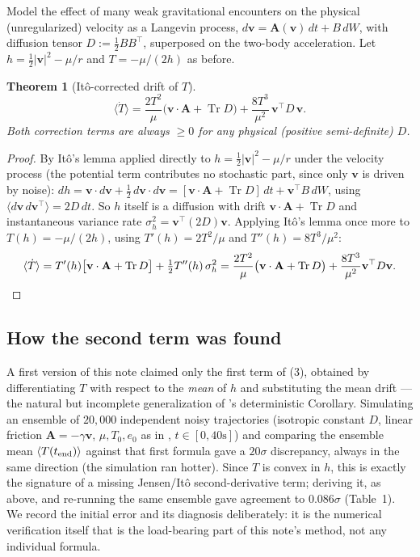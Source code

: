 \documentclass[12pt]{amsart}
\theoremstyle{plain}
\newtheorem{theorem}{Theorem}[section]
\theoremstyle{remark}
\begin{document}
Model the effect of many weak gravitational encounters on the physical (unregularized) velocity as a Langevin process, $d\mathbf v = \mathbf A(\mathbf v)\,dt+B\,dW$, with diffusion tensor $D:=\tfrac12BB^\top$, superposed on the two-body acceleration. Let $h=\tfrac12|\mathbf v|^2-\mu/r$ and $T=-\mu/(2h)$ as before.

\begin{theorem}[It\^o-corrected drift of $T$]\label{thm:ito}
\begin{equation}
\langle\dot T\rangle = \frac{2T^2}{\mu}\big(\mathbf v\cdot\mathbf A+\operatorname{Tr}D\big) + \frac{8T^3}{\mu^2}\,\mathbf v^\top D\,\mathbf v. \tag{3}
\end{equation}
Both correction terms are always $\ge0$ for any physical (positive semi-definite) $D$.
\end{theorem}

\begin{proof}
By It\^o's lemma applied directly to $h=\tfrac12|\mathbf v|^2-\mu/r$ under the velocity process (the potential term contributes no stochastic part, since only $\mathbf v$ is driven by noise): $dh=\mathbf v\cdot d\mathbf v+\tfrac12\,d\mathbf v\cdot d\mathbf v=[\mathbf v\cdot\mathbf A+\operatorname{Tr}D]\,dt+\mathbf v^\top B\,dW$, using $\langle d\mathbf v\,d\mathbf v^\top\rangle=2D\,dt$. So $h$ itself is a diffusion with drift $\mathbf v\cdot\mathbf A+\operatorname{Tr}D$ and instantaneous variance rate $\sigma_h^2=\mathbf v^\top(2D)\mathbf v$. Applying It\^o's lemma once more to $T(h)=-\mu/(2h)$, using $T'(h)=2T^2/\mu$ and $T''(h)=8T^3/\mu^2$:
\[
\langle\dot T\rangle = T'(h)\big[\mathbf v\cdot\mathbf A+\operatorname{Tr}D\big] + \tfrac12T''(h)\,\sigma_h^2 = \frac{2T^2}{\mu}\big(\mathbf v\cdot\mathbf A+\operatorname{Tr}D\big)+\frac{8T^3}{\mu^2}\mathbf v^\top D\mathbf v. \qedhere
\]
\end{proof}

\subsection*{How the second term was found}
A first version of this note claimed only the first term of (3), obtained by differentiating $T$ with respect to the \emph{mean} of $h$ and substituting the mean drift --- the natural but incomplete generalization of \cite{Ebert2026LeviCivita}'s deterministic Corollary. Simulating an ensemble of $20{,}000$ independent noisy trajectories (isotropic constant $D$, linear friction $\mathbf A=-\gamma\mathbf v$, $\mu,T_0,e_0$ as in \cite{Ebert2026Clock}, $t\in[0,40\text{s}]$) and comparing the ensemble mean $\langle T(t_{\rm end})\rangle$ against that first formula gave a $20\sigma$ discrepancy, always in the same direction (the simulation ran hotter). Since $T$ is convex in $h$, this is exactly the signature of a missing Jensen/It\^o second-derivative term; deriving it, as above, and re-running the same ensemble gave agreement to $0.086\sigma$ (Table~1). We record the initial error and its diagnosis deliberately: it is the numerical verification itself that is the load-bearing part of this note's method, not any individual formula.
\end{document}
